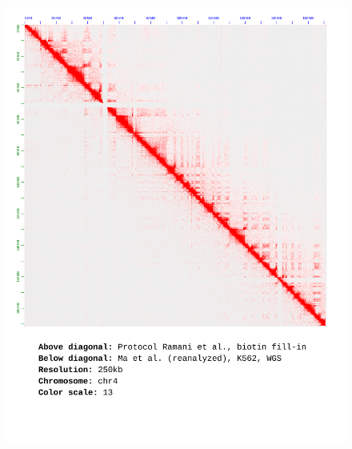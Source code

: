 \documentclass[a4paper,14pt]{extarticle}
\begin{document}
\begin{figure}[hp!] \includegraphics[width=1\textwidth]{ma-wgs_s30_chr4_500-100kb_13.pdf} \end{figure}
\end{document}
